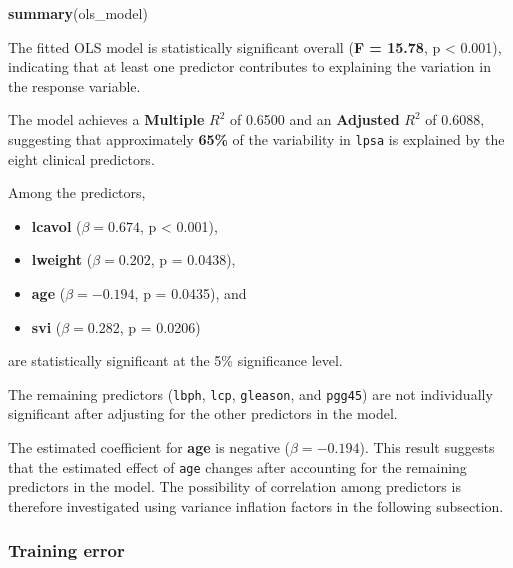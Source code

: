 \documentclass[
  11pt,
]{article}
\newenvironment{Shaded}{\begin{snugshade}}{\end{snugshade}}
\newcommand{\FunctionTok}[1]{\textcolor[rgb]{0.13,0.29,0.53}{\textbf{#1}}}
\newcommand{\NormalTok}[1]{#1}
\providecommand{\tightlist}{%
  \setlength{\itemsep}{0pt}\setlength{\parskip}{0pt}}
\begin{document}
\begin{Shaded}
\begin{Highlighting}[]
\FunctionTok{summary}\NormalTok{(ols\_model)}
\end{Highlighting}
\end{Shaded}

The fitted OLS model is statistically significant overall (\textbf{F =
15.78}, p \textless{} 0.001), indicating that at least one predictor
contributes to explaining the variation in the response variable.

The model achieves a \textbf{Multiple} \(R^2\) of 0.6500 and an
\textbf{Adjusted} \(R^2\) of 0.6088, suggesting that approximately
\textbf{65\%} of the variability in \texttt{lpsa} is explained by the
eight clinical predictors.

Among the predictors,

\begin{itemize}
\tightlist
\item
  \textbf{lcavol} (\(\beta=0.674\), p \textless{} 0.001),
\item
  \textbf{lweight} (\(\beta=0.202\), p = 0.0438),
\item
  \textbf{age} (\(\beta=-0.194\), p = 0.0435), and
\item
  \textbf{svi} (\(\beta=0.282\), p = 0.0206)
\end{itemize}

are statistically significant at the 5\% significance level.

The remaining predictors (\texttt{lbph}, \texttt{lcp}, \texttt{gleason},
and \texttt{pgg45}) are not individually significant after adjusting for
the other predictors in the model.

The estimated coefficient for \textbf{age} is negative
(\(\beta=-0.194\)). This result suggests that the estimated effect of
\texttt{age} changes after accounting for the remaining predictors in
the model. The possibility of correlation among predictors is therefore
investigated using variance inflation factors in the following
subsection.

\subsubsection{Training error}\label{training-error}
\end{document}
